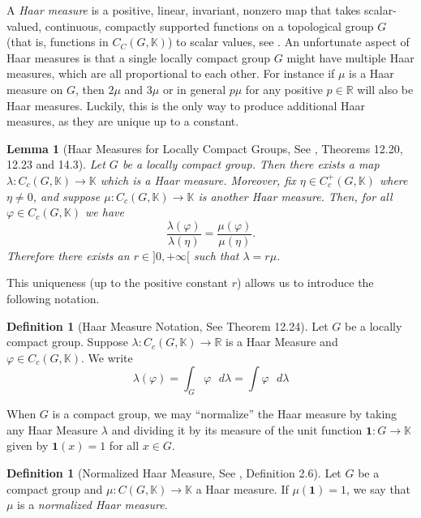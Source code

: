 \documentclass{amsart}
\newtheorem{lemma}[theorem]{Lemma}
\theoremstyle{definition}
\newtheorem{definition}[theorem]{Definition}
\numberwithin{equation}{section}
\newcommand{\cgk}{C(G,\mathbb{K})}
\newcommand{\cck}{C_C (G,\mathbb{K})}
\newcommand{\R}{\mathbb{R}}
\newcommand{\K}{\mathbb{K}}
\begin{document}
A \textit{Haar measure} is a positive, linear, invariant, nonzero map that takes scalar-valued, continuous, compactly supported functions on a topological group $G$ (that is, functions in $\cck$) to scalar values, see \cite[Definitions 12.3, 14.2]{stroppel}.
An unfortunate aspect of Haar measures is that a single locally compact group $G$ might have multiple Haar measures, which are all proportional to each other. For instance if $\mu$ is a Haar measure on $G$, then $2\mu$ and $3\mu$ or in general $p\mu$ for any positive $p\in \R$ will also be Haar measures. Luckily, this is the only way to produce additional Haar measures, as they are unique up to a constant.

\begin{lemma}[Haar Measures for Locally Compact Groups, See \cite{stroppel}, Theorems 12.20, 12.23 and 14.3]\label{resultofexistence} Let $G$ be a locally compact group.
 Then there exists a map $\lambda:C_c(G,\K)\rightarrow\K$ which is a Haar measure. Moreover, fix $\eta\in C_c^+(G,\K)$ where $\eta\neq0$, and
 suppose $\mu:C_c(G,\K)\rightarrow\K$ is another Haar measure. Then, for all $\varphi\in C_c(G,\K)$ we have
 $$ \frac{\lambda(\varphi)}{\lambda(\eta)}=\frac{\mu(\varphi)}{\mu(\eta)}.
$$ Therefore there exists an $r \in ]0,+\infty[$ such that $\lambda=r\mu$.
\end{lemma}

This uniqueness (up to the positive constant $r$) allows us to introduce the following notation.

\begin{definition}[Haar Measure Notation, See \cite{stroppel} Theorem 12.24] Let $G$ be a locally compact group.  Suppose $\lambda:C_c(G,\K)\rightarrow\R$ is a Haar Measure and $\varphi\in C_c(G,\K)$.  We write
 \[
 \lambda(\varphi)= \int_G \varphi \text{ }d\lambda=\int \varphi \text{ }d\lambda
 \]
\end{definition}

When  $G$ is a compact group, we may ``normalize'' the Haar measure by taking any Haar Measure $\lambda$ and dividing it by its measure of the unit function $\textbf{1}:G\rightarrow\K$ given by $\textbf{1}(x)=1$ for all $x \in G$. 

\begin{definition}[Normalized Haar Measure, See \cite{hofmann}, Definition 2.6]\label{defnormhaarmeasure}Let $G$ be a compact group and $\mu:\cgk\rightarrow\K$ a Haar measure. If $\mu(\textbf{1})=1$,  we say that $\mu$ is a \textit{normalized Haar measure}.
\end{definition}
\end{document}
